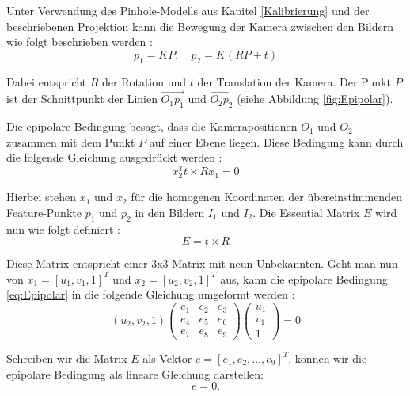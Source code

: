 Unter Verwendung des Pinhole-Modells aus Kapitel \ref{Kalibrierung} und der beschriebenen Projektion kann die Bewegung der Kamera zwischen den Bildern wie folgt beschrieben werden \cite{gao2021vSLAM}:
\begin{equation}
    p_1 = KP, \quad p_2 = K(RP + t)
\end{equation}

Dabei entspricht \( R \) der Rotation und \( t \) der Translation der Kamera. Der Punkt \( P \) ist der Schnittpunkt der Linien \( \overrightarrow{O_1p_1} \) und \( \overrightarrow{O_2p_2} \) (siehe Abbildung \ref{fig:Epipolar}). \cite{gao2021vSLAM}

Die epipolare Bedingung besagt, dass die Kamerapositionen \( O_1 \) und \( O_2 \) zusammen mit dem Punkt \( P \) auf einer Ebene liegen. Diese Bedingung kann durch die folgende Gleichung ausgedrückt werden \cite{gao2021vSLAM}:
\begin{equation}
    x_2^T t \times R x_1 = 0\label{eq:Epipolar}
\end{equation}

Hierbei stehen \( x_1 \) und \( x_2 \) für die homogenen Koordinaten der übereinstimmenden Feature-Punkte \( p_1 \) und \( p_2 \) in den Bildern \( I_1 \) und \( I_2 \). Die Essential Matrix \( E \) wird nun wie folgt definiert \cite{gao2021vSLAM}:
\begin{equation}
    E = t \times R
\end{equation}

Diese Matrix entspricht einer 3x3-Matrix mit neun Unbekannten. Geht man nun von \( x_1 = [u_1, v_1, 1]^T \) und \( x_2 = [u_2, v_2, 1]^T \) aus, kann die epipolare Bedingung \ref{eq:Epipolar} in die folgende Gleichung umgeformt werden \cite{gao2021vSLAM}:
\begin{equation}
(u_2, v_2, 1) 
\begin{pmatrix}
    e_1 & e_2 & e_3 \\
    e_4 & e_5 & e_6 \\
    e_7 & e_8 & e_9
\end{pmatrix}
\begin{pmatrix}
    u_1 \\ v_1 \\ 1
\end{pmatrix}
= 0
\end{equation}

Schreiben wir die Matrix \( E \) als Vektor \( e = [e_1, e_2, \ldots, e_9]^T \), können wir die epipolare Bedingung als lineare Gleichung darstellen:
\begin{equation}
    [u_2u_1, u_2v_1, u_2, v_2u_1, v_2v_1, v_2, u_1, v_1, 1] e = 0.
\end{equation}

